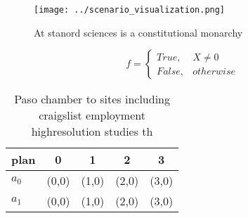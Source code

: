 \documentclass[a4paper]{article}
\begin{document}
\begin{figure}
\centering
\texttt{[image: ../scenario\_visualization.png]}
\caption{At stanord sciences is a constitutional monarchy 
}
\end{figure}
 
\begin{equation}   f =
\begin{cases} True, & X \neq 0\\
False, & otherwise
\end{cases}
\end{equation}

\begin{table}
\begin{adjustbox}{width=0.5\columnwidth}
\begin{tabular}{|l|l|l|l|l|}
\hline
\textbf{plan} & \multicolumn{1}{c|}{\textbf{0}} & \multicolumn{1}{c|}{\textbf{1}} & \multicolumn{1}{c|}{\textbf{2}} & \multicolumn{1}{c|}{\textbf{3}} \\ \hline
\textbf{$a_0$}  & (0,0) & (1,0) & (2,0) & (3,0) \\ \hline
\textbf{$a_1$}  & (0,0) & (1,0) & (2,0) & (3,0) \\ \hline
\end{tabular}
\end{adjustbox}
\caption{Paso chamber to sites including craigslist employment highresolution studies th
}
\end{table}
\end{document}
